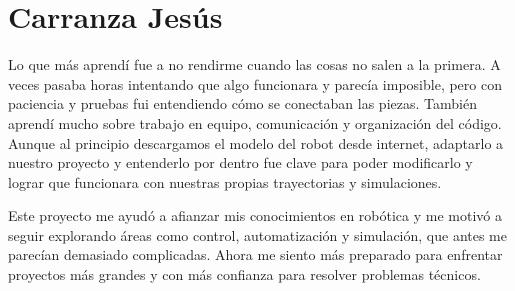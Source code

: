 \section{Carranza Jesús}
Lo que más aprendí fue a no rendirme cuando las cosas no salen a la primera. A veces pasaba horas intentando que algo funcionara y parecía imposible, pero con paciencia y pruebas fui entendiendo cómo se conectaban las piezas. También aprendí mucho sobre trabajo en equipo, comunicación y organización del código. Aunque al principio descargamos el modelo del robot desde internet, adaptarlo a nuestro proyecto y entenderlo por dentro fue clave para poder modificarlo y lograr que funcionara con nuestras propias trayectorias y simulaciones.

Este proyecto me ayudó a afianzar mis conocimientos en robótica y me motivó a seguir explorando áreas como control, automatización y simulación, que antes me parecían demasiado complicadas. Ahora me siento más preparado para enfrentar proyectos más grandes y con más confianza para resolver problemas técnicos.

